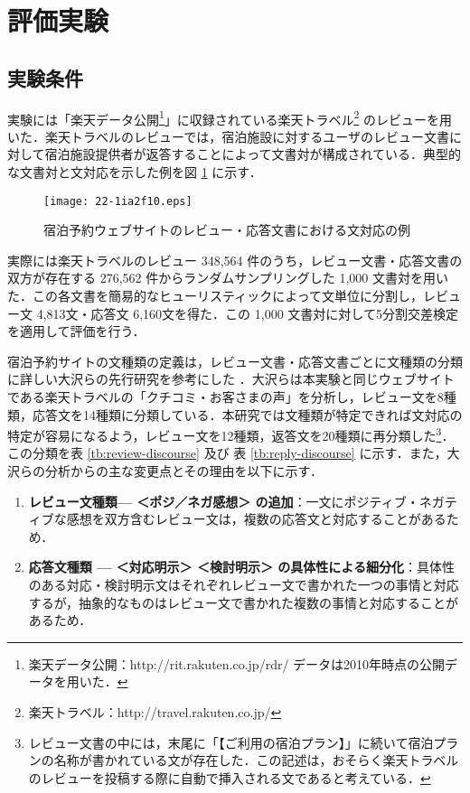 \documentclass[japanese]{jnlp_1.4}
\begin{document}
\section{評価実験}

\subsection{実験条件}

実験には「楽天データ公開\footnote{楽天データ公開：http://rit.rakuten.co.jp/rdr/ データは2010年時点の公開データを用いた．}」に収録されている楽天トラベル\footnote{楽天トラベル：http://travel.rakuten.co.jp/} のレビューを用いた．楽天トラベルのレビューでは，宿泊施設に対するユーザのレビュー文書に対して宿泊施設提供者が返答することによって文書対が構成されている．典型的な文書対と文対応を示した例を図 \ref{fig:dependency-example} に示す．

\begin{figure}[b]
\begin{center}
\texttt{[image: 22-1ia2f10.eps]}
\end{center}
\caption{宿泊予約ウェブサイトのレビュー・応答文書における文対応の例}
\label{fig:dependency-example}
\end{figure}

実際には楽天トラベルのレビュー 348,564 件のうち，レビュー文書・応答文書の双方が存在する 276,562 件からランダムサンプリングした 1,000 文書対を用いた．この各文書を簡易的なヒューリスティックによって文単位に分割し，レビュー文 4,813文・応答文 6,160文を得た．この 1,000 文書対に対して5分割交差検定を適用して評価を行う．

宿泊予約サイトの文種類の定義は，レビュー文書・応答文書ごとに文種類の分類に詳しい大沢らの先行研究を参考にした \cite{大沢:2010}．大沢らは本実験と同じウェブサイトである楽天トラベルの「クチコミ・お客さまの声」を分析し，レビュー文を8種類，応答文を14種類に分類している．本研究では文種類が特定できれば文対応の特定が容易になるよう，レビュー文を12種類，返答文を20種類に再分類した\footnote{レビュー文書の中には，末尾に「【ご利用の宿泊プラン】」に続いて宿泊プランの名称が書かれている文が存在した．この記述は，おそらく楽天トラベルのレビューを投稿する際に自動で挿入される文であると考えている．}．この分類を表 \ref{tb:review-discourse} 及び 表 \ref{tb:reply-discourse} に示す．また，大沢らの分析からの主な変更点とその理由を以下に示す．

\begin{enumerate}
  \renewcommand{\labelenumi}{}
  \item \textbf{レビュー文種類— ＜ポジ／ネガ感想＞ の追加}：一文にポジティブ・ネガティブな感想を双方含むレビュー文は，複数の応答文と対応することがあるため．
  \item \textbf{応答文種類 — ＜対応明示＞ ＜検討明示＞ の具体性による細分化}：具体性のある対応・検討明示文はそれぞれレビュー文で書かれた一つの事情と対応するが，抽象的なものはレビュー文で書かれた複数の事情と対応することがあるため．
\end{enumerate}
\end{document}
